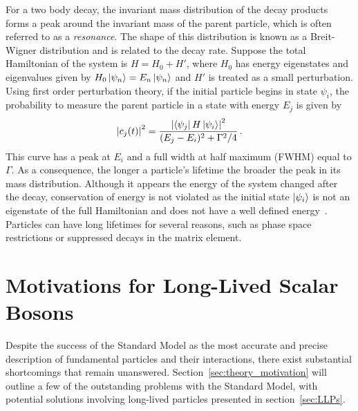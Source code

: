 For a two body decay, the invariant mass distribution of the decay products forms a peak around the invariant mass of the parent particle, which is often referred to as a \textit{resonance}. The shape of this distribution is known as a Breit-Wigner distribution and is related to the decay rate. Suppose the total Hamiltonian of the system is $H=H_0+H'$, where $H_0$ has energy eigenstates and eigenvalues given by $H_0\ket{\psi_n}=E_n\ket{\psi_n}$ and $H'$ is treated as a small perturbation. Using first order perturbation theory, if the initial particle begins in state $\psi_i$, the probability to measure the parent particle in a state with energy $E_j$ is given by
\begin{equation}
	\left|c_j(t)\right|^2=\frac{\left|\bra{\psi_j}H\ket{\psi_i}\right|^2}{(E_j-E_i)^2+\Gamma^2/4}\,.
\end{equation}
This curve has a peak at $E_i$ and a full width at half maximum (FWHM) equal to $\Gamma$. As a consequence, the longer a particle's lifetime the broader the peak in its mass distribution. Although it appears the energy of the system changed after the decay, conservation of energy is not violated as the initial state $\ket{\psi_i}$ is not an eigenstate of the full Hamiltonian and does not have a well defined energy~\cite{breitwigner}. Particles can have long lifetimes for several reasons, such as phase space restrictions or suppressed decays in the matrix element.

\section{Motivations for Long-Lived Scalar Bosons} \label{sec:BSM}
Despite the success of the Standard Model as the most accurate and precise description of fundamental particles and their interactions, there exist substantial shortcomings that remain unanswered. Section~\ref{sec:theory_motivation} will outline a few of the outstanding problems with the Standard Model, with potential solutions involving long-lived particles presented in section~\ref{sec:LLPs}.

